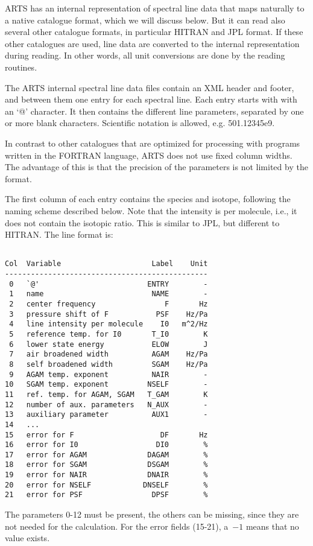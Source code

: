 ARTS has an internal representation of spectral line data that maps
naturally to a native catalogue format, which we will discuss
below. But it can read also several other catalogue formats, in
particular HITRAN and JPL format. If these other catalogues are used,
line data are converted to the internal representation during
reading. In other words, all unit conversions are done by the reading
routines.

The ARTS internal spectral line data files contain an XML header and
footer, and between them one entry for each spectral line. Each entry
starts with with an `@' character. It then contains the different line
parameters, separated by one or more blank characters. Scientific
notation is allowed, e.g. 501.12345e9.  

In contrast to other catalogues that are optimized for processing with
programs written in the FORTRAN language, ARTS does not use fixed
column widths. The advantage of this is that the precision of the
parameters is not limited by the format.

The first column of each entry contains the species and isotope,
following the naming scheme described below. Note that the intensity
is per molecule, i.e., it does not contain the isotopic ratio. This is
similar to JPL, but different to HITRAN.  The line format is:

\begin{lstlisting}

Col  Variable                     Label    Unit     
-----------------------------------------------      
 0   `@'                         ENTRY        -     
 1   name                         NAME        -     
 2   center frequency                F       Hz     
 3   pressure shift of F           PSF    Hz/Pa    
 4   line intensity per molecule    I0   m^2/Hz     
 5   reference temp. for I0       T_I0        K
 6   lower state energy           ELOW        J    
 7   air broadened width          AGAM    Hz/Pa     
 8   self broadened width         SGAM    Hz/Pa
 9   AGAM temp. exponent          NAIR        -     
10   SGAM temp. exponent         NSELF        - 
11   ref. temp. for AGAM, SGAM   T_GAM        K
12   number of aux. parameters   N_AUX        -
13   auxiliary parameter          AUX1        -
14   ... 
15   error for F                    DF       Hz
16   error for I0                  DI0        %
17   error for AGAM              DAGAM        %
18   error for SGAM              DSGAM        %
19   error for NAIR              DNAIR        %
20   error for NSELF            DNSELF        %
21   error for PSF                DPSF        %

\end{lstlisting}
The parameters 0-12 must be present, the others can be missing, since
they are not needed for the calculation. For the error fields (15-21),
a~$-1$ means that no value exists.\\

